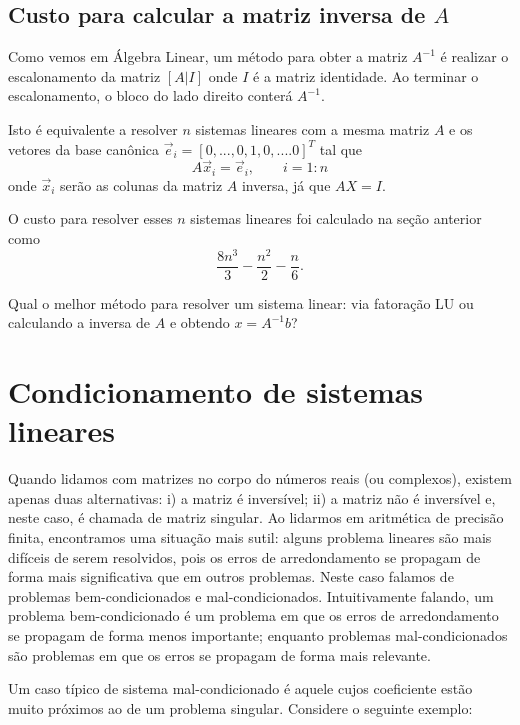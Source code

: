 \subsection{Custo para calcular a matriz inversa de $A$}
Como vemos em Álgebra Linear, um método para obter a matriz $A^{-1}$ é realizar o escalonamento da matriz $[A|I]$ onde $I$ é a matriz identidade. Ao terminar o escalonamento, o bloco do lado direito conterá $A^{-1}$.

Isto é equivalente a resolver $n$ sistemas lineares com a mesma matriz $A$ e os vetores da base canônica $\vec e_i = [0,...,0,1,0,....0]^T$ tal que
$$ A \vec x_i = \vec e_i, \quad\quad i=1:n $$
onde $\vec x_i$ serão as colunas da matriz $A$ inversa, já que $A X=I$.

O custo para resolver esses $n$ sistemas lineares foi calculado na seção anterior como
$$\frac{8n^3}{3}-\frac{n^2}{2}-\frac{n}{6}.$$

\begin{ex}
 Qual o melhor método para resolver um sistema linear: via fatoração LU ou calculando a inversa de $A$ e obtendo $x=A^{-1}b$?
\end{ex}






\section{Condicionamento de sistemas lineares}

Quando lidamos com matrizes no corpo do números reais (ou complexos), existem apenas duas alternativas: i) a matriz é inversível; ii) a matriz não é inversível e, neste caso, é chamada de matriz singular. Ao lidarmos em aritmética de precisão finita, encontramos uma situação mais sutil: alguns problema lineares são mais difíceis de serem resolvidos, pois os erros de arredondamento se propagam de forma mais significativa que em outros problemas. Neste caso falamos de problemas bem-condicionados e mal-condicionados. Intuitivamente falando, um problema bem-condicionado é um problema em que os erros de arredondamento se propagam de forma menos importante; enquanto problemas mal-condicionados são problemas em que os erros se propagam de forma mais relevante.

Um caso típico de sistema mal-condicionado é aquele cujos coeficiente estão muito próximos ao de um problema singular. Considere o seguinte exemplo:

